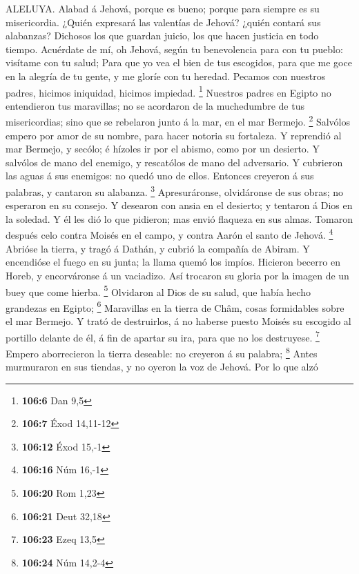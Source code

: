  ALELUYA. Alabad á Jehová, porque es bueno; porque para
siempre es su misericordia.  ¿Quién expresará las valentías
de Jehová? ¿quién contará sus alabanzas?  Dichosos los que
guardan juicio, los que hacen justicia en todo tiempo. 
Acuérdate de mí, oh Jehová, según tu benevolencia para con tu pueblo:
visítame con tu salud;  Para que yo vea el bien de tus
escogidos, para que me goce en la alegría de tu gente, y me gloríe con
tu heredad.  Pecamos con nuestros padres, hicimos iniquidad,
hicimos impiedad. \footnote{\textbf{106:6} Dan 9,5} 
Nuestros padres en Egipto no entendieron tus maravillas; no se acordaron
de la muchedumbre de tus misericordias; sino que se rebelaron junto á la
mar, en el mar Bermejo. \footnote{\textbf{106:7} Éxod 14,11-12}
 Salvólos empero por amor de su nombre, para hacer notoria
su fortaleza.  Y reprendió al mar Bermejo, y secólo; é
hízoles ir por el abismo, como por un desierto.  Y salvólos
de mano del enemigo, y rescatólos de mano del adversario. 
Y cubrieron las aguas á sus enemigos: no quedó uno de ellos.
 Entonces creyeron á sus palabras, y cantaron su alabanza.
\footnote{\textbf{106:12} Éxod 15,-1}  Apresuráronse,
olvidáronse de sus obras; no esperaron en su consejo.  Y
desearon con ansia en el desierto; y tentaron á Dios en la soledad.
 Y él les dió lo que pidieron; mas envió flaqueza en sus
almas.  Tomaron después celo contra Moisés en el campo, y
contra Aarón el santo de Jehová. \footnote{\textbf{106:16} Núm 16,-1}
 Abrióse la tierra, y tragó á Dathán, y cubrió la compañía
de Abiram.  Y encendióse el fuego en su junta; la llama
quemó los impíos.  Hicieron becerro en Horeb, y
encorváronse á un vaciadizo.  Así trocaron su gloria por la
imagen de un buey que come hierba. \footnote{\textbf{106:20} Rom 1,23}
 Olvidaron al Dios de su salud, que había hecho grandezas
en Egipto; \footnote{\textbf{106:21} Deut 32,18} 
Maravillas en la tierra de Châm, cosas formidables sobre el mar Bermejo.
 Y trató de destruirlos, á no haberse puesto Moisés su
escogido al portillo delante de él, á fin de apartar su ira, para que no
los destruyese. \footnote{\textbf{106:23} Ezeq 13,5} 
Empero aborrecieron la tierra deseable: no creyeron á su palabra;
\footnote{\textbf{106:24} Núm 14,2-4}  Antes murmuraron en
sus tiendas, y no oyeron la voz de Jehová.  Por lo que alzó
